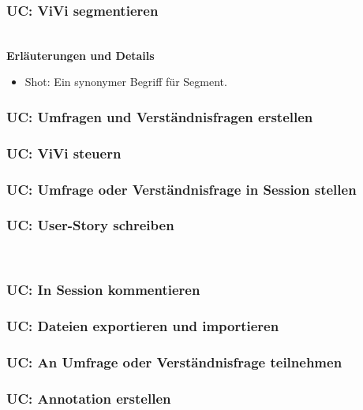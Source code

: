 \subsubsection{UC: ViVi segmentieren}

\\[0.5cm]
\textbf{Erläuterungen und Details}
\begin{itemize}
	\item Shot: Ein synonymer Begriff für Segment.
\end{itemize}
\pagebreak

\subsubsection{UC: Umfragen und Verständnisfragen erstellen}

\pagebreak

\subsubsection{UC: ViVi steuern}

\pagebreak

\subsubsection{UC: Umfrage oder Verständnisfrage in Session stellen}

\pagebreak

\subsubsection{UC: User-Story schreiben}

\\[0.5cm]
\pagebreak

\subsubsection{UC: In Session kommentieren}

\pagebreak

\subsubsection{UC: Dateien exportieren und importieren}

\pagebreak

\subsubsection{UC: An Umfrage oder Verständnisfrage teilnehmen}

\pagebreak

\subsubsection{UC: Annotation erstellen}

\pagebreak